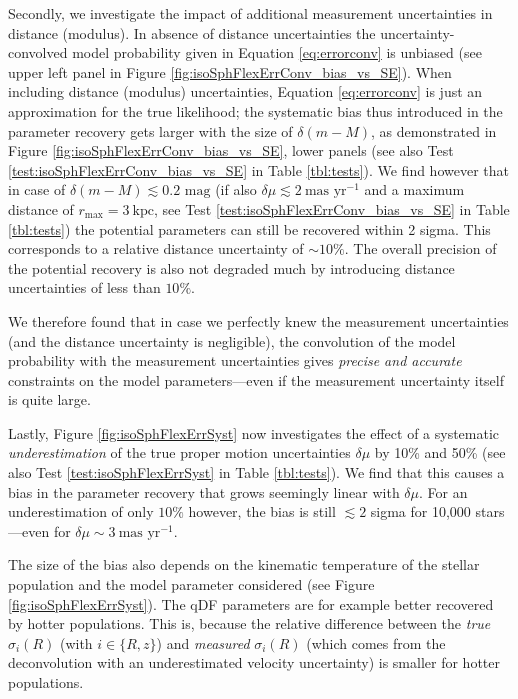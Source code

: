 Secondly, we investigate the impact of additional measurement uncertainties in distance (modulus). In absence of distance uncertainties the uncertainty-convolved model probability given in Equation \ref{eq:errorconv} is unbiased (see upper left panel in Figure \ref{fig:isoSphFlexErrConv_bias_vs_SE}).  When including distance (modulus) uncertainties, Equation \ref{eq:errorconv} is just an approximation for the true likelihood; the systematic bias thus introduced in the parameter recovery gets larger with the size of $\delta (m-M)$, as demonstrated in Figure \ref{fig:isoSphFlexErrConv_bias_vs_SE}, lower panels (see also Test \ref{test:isoSphFlexErrConv_bias_vs_SE} in Table \ref{tbl:tests}).  We find however that in case of $\delta(m-M) \lesssim 0.2 \text{ mag}$ (if also $\delta \mu \lesssim 2 ~\text{mas yr}^{-1}$ and a maximum distance of $r_\text{max} = 3~\text{kpc}$, see Test \ref{test:isoSphFlexErrConv_bias_vs_SE} in Table \ref{tbl:tests}) the potential parameters can still be recovered within 2 sigma. This corresponds to a relative distance uncertainty of $\sim10\%$. The overall precision of the potential recovery is also not degraded much by introducing distance uncertainties of less than $10\%$.

We therefore found that in case we perfectly knew the measurement uncertainties (and the distance uncertainty is negligible), the convolution of the model probability with the measurement uncertainties gives \emph{precise and accurate} constraints on the model parameters---even if the measurement uncertainty itself is quite large.

Lastly, Figure \ref{fig:isoSphFlexErrSyst} now investigates the effect of a systematic \emph{underestimation} of the true proper motion uncertainties $\delta \mu$ by 10\% and 50\% (see also Test \ref{test:isoSphFlexErrSyst} in Table \ref{tbl:tests}). We find that this causes a bias in the parameter recovery that grows seemingly linear with $\delta \mu$. For an underestimation of only $10\%$ however, the bias is still $\lesssim 2$ sigma for 10,000 stars---even for $\delta \mu \sim 3~\text{mas yr}^{-1}$.

The size of the bias also depends on the kinematic temperature of the stellar population and the model parameter considered (see Figure \ref{fig:isoSphFlexErrSyst}). The qDF parameters are for example better recovered by hotter populations. This is, because the relative difference between the \emph{true} $\sigma_i(R)$ (with $i \in \{R,z\}$) and \emph{measured} $\sigma_i(R)$ (which comes from the deconvolution with an underestimated velocity uncertainty) is smaller for hotter populations. 
